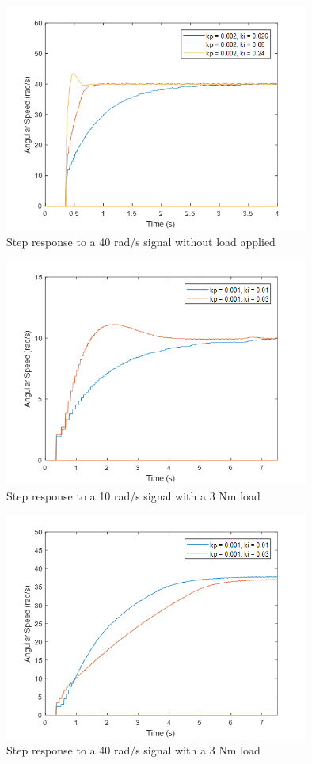 \begin{figure}[h!p]
\centering
\includegraphics[width=10cm]{Images/plots/plot_3.png} 
\caption[plot3]{Step response to a 40 rad/s signal without load applied}
\label{fig:plot3}
\end{figure}

\begin{figure}[h!p]
\centering
\includegraphics[width=10cm]{Images/plots/plot_4.png} 
\caption[plot4]{Step response to a 10 rad/s signal with a 3 Nm load}
\label{fig:plot4}
\end{figure}

\begin{figure}[h!p]
\centering
\includegraphics[width=10cm]{Images/plots/plot_5.png} 
\caption[plot5]{Step response to a 40 rad/s signal with a 3 Nm load}
\label{fig:plot5}
\end{figure}

